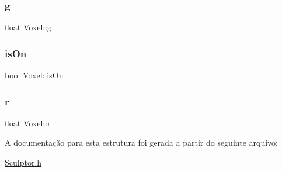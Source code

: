 \subsubsection{\texorpdfstring{g}{g}}
{\footnotesize\ttfamily float Voxel\+::g}

\mbox{\label{structVoxel_a6fbe8bd53f64685ac4210726d40fc775}} 
\subsubsection{\texorpdfstring{is\+On}{isOn}}
{\footnotesize\ttfamily bool Voxel\+::is\+On}

\mbox{\label{structVoxel_a06872ec79b836120b551a848968c0f1b}} 
\subsubsection{\texorpdfstring{r}{r}}
{\footnotesize\ttfamily float Voxel\+::r}



A documentação para esta estrutura foi gerada a partir do seguinte arquivo\+:\begin{DoxyCompactItemize}
\item 
\hyperlink{Sculptor_8h}{Sculptor.\+h}\end{DoxyCompactItemize}
